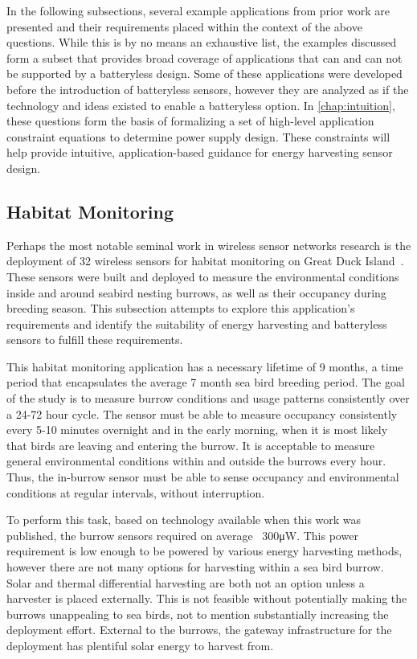 \noindent In the following subsections, several example applications from prior work are presented and their requirements placed within the context of the above questions. While this is by no means an exhaustive list, the examples discussed form a subset that provides broad coverage of applications that can and can not be supported by a batteryless design. 
Some of these applications were developed before the introduction of batteryless sensors, however they are analyzed as if the technology and ideas existed to enable a batteryless option. 
In \cref{chap:intuition}, these questions form the basis of formalizing a set of high-level application constraint equations to determine power supply design.
These constraints will help provide intuitive, application-based guidance for energy harvesting sensor design.

\subsection{Habitat Monitoring}
Perhaps the most notable seminal work in wireless sensor networks research is the deployment of 32 wireless sensors for habitat monitoring on Great Duck Island~\cite{mainwaring2002wireless}.
These sensors were built and deployed to measure the environmental conditions inside and around seabird nesting burrows, as well as their occupancy during breeding season.
This subsection attempts to explore this application's requirements and identify the suitability of energy harvesting and batteryless sensors to fulfill these requirements.

This habitat monitoring application has a necessary lifetime of 9 months, a time period that encapsulates the average 7 month sea bird breeding period. 
The goal of the study is to measure burrow conditions and usage patterns consistently over a 24-72 hour cycle. The sensor must be able to measure occupancy consistently every 5-10 minutes overnight and in the early morning, when it is most likely that birds are leaving and entering the burrow. 
It is acceptable to measure general environmental conditions within and outside the burrows every hour. 
Thus, the in-burrow sensor must be able to sense occupancy and environmental conditions at regular intervals, without interruption.

To perform this task, based on technology available when this work was published, the burrow sensors required on average ~300\si{\micro\watt}. This power requirement is low enough to be powered by various energy harvesting methods, however there are not many options for harvesting within a sea bird burrow. Solar and thermal differential harvesting are both not an option unless a harvester is placed externally. This is not feasible without potentially making the burrows unappealing to sea birds, not to mention substantially increasing the deployment effort. 
External to the burrows, the gateway infrastructure for the deployment has plentiful solar energy to harvest from. 

